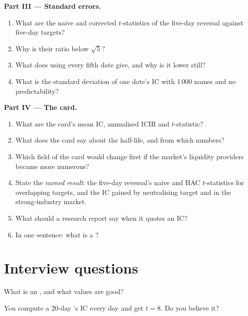 \begin{problem}
\medskip\noindent\textbf{Part III --- Standard errors.}
\begin{enumerate}[resume]
\item What are the naive and corrected $t$-statistics of the five-day reversal against five-day targets?
\item Why is their ratio below $\sqrt5$?
\item What does using every fifth date give, and why is it lower still?
\item What is the standard deviation of one date's IC with 1\,000 names and no predictability?
\end{enumerate}

\medskip\noindent\textbf{Part IV --- The card.}
\begin{enumerate}[resume]
\item What are the card's mean IC, annualised ICIR and $t$-statistic?
\item What does the card say about the half-life, and from which numbers?
\item Which field of the card would change first if the market's liquidity providers became more numerous?
\item State the \emph{named result}: the five-day reversal's naive and HAC $t$-statistics for overlapping targets, and the IC gained by
neutralising target and  in the strong-industry market.
\item What should a research report say when it quotes an IC?
\item In one sentence: what is a ?
\end{enumerate}
\end{problem}

\section{Interview questions}

\begin{interviewq}\label{iq:rs:anatomy-of-a-predictor:1}
What is an , and what values are good?
\end{interviewq}

\begin{interviewq}\label{iq:rs:anatomy-of-a-predictor:2}
You compute a 20-day 's IC every day and get $t = 8$. Do you believe it?
\end{interviewq}

